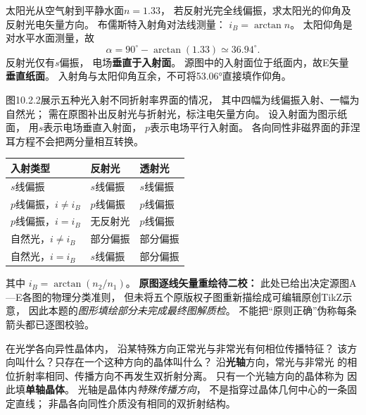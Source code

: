 \problemtext 太阳光从空气射到平静水面$n=1.33$，
若反射光完全线偏振，求太阳光的仰角及反射光电矢量方向。
\workings
布儒斯特入射角对法线测量：
$i_B=\arctan n$。
太阳仰角是对水平水面测量，故
\[
\boxed{\alpha=90^\circ-\arctan(1.33)
\simeq36.94^\circ}.
\]
反射光仅有$s$偏振，
电场\textbf{垂直于入射面}。
源图中的入射面位于纸面内，故E矢量
\textbf{垂直纸面}。
\crosscheck 入射角与太阳仰角互余，不可将53.06°直接填作仰角。

\problemtext 图10.2.2展示五种光入射不同折射率界面的情况，
其中四幅为线偏振入射、一幅为自然光；
需在原图补出反射光与折射光，标注电矢量方向。
\workings
设入射面为图示纸面，
用$s$表示电场垂直入射面，
$p$表示电场平行入射面。
各向同性非磁界面的菲涅耳方程不会把两分量相互转换。
\begin{center}
\begin{tabular}{lll}
\hline
入射类型 & 反射光 & 透射光\\ \hline
$s$线偏振 & $s$线偏振 & $s$线偏振\\
$p$线偏振，$i\ne i_B$ & $p$线偏振 & $p$线偏振\\
$p$线偏振，$i=i_B$ & 无反射光 & $p$线偏振\\
自然光，$i\ne i_B$ & 部分偏振 & 部分偏振\\
自然光，$i=i_B$ & $s$线偏振 & 部分偏振\\
\hline
\end{tabular}
\end{center}
其中
$\boxed{i_B=\arctan(n_2/n_1)}$。
\crosscheck \textbf{原图逐线矢量重绘待二校：}
此处已给出决定源图A—E各图的物理分类准则，
但未将五个原版权子图重新描绘成可编辑原创TikZ示意，
因此本题的\emph{图形填绘部分未完成最终图解质检}。
不能把“原则正确”伪称每条箭头都已逐图校验。

\problemtext 在光学各向异性晶体内，
沿某特殊方向正常光与非常光有何相位传播特征？
该方向叫什么？只存在一个这种方向的晶体叫什么？
\workings
沿\textbf{光轴}方向，常光与非常光
的相位折射率相同、传播方向不再发生双折射分离。
只有一个光轴方向的晶体称为
因此填\textbf{单轴晶体}。
\crosscheck 光轴是晶体内\emph{特殊传播方向}，
不是指穿过晶体几何中心的一条固定直线；
非晶各向同性介质没有相同的双折射结构。
